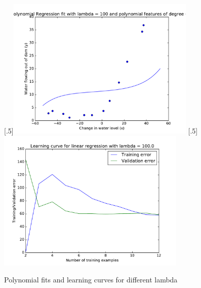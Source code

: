 \documentclass{article}
\begin{document}
\begin{figure}[h]
  [.5\linewidth]{\includegraphics[width=9cm]{part2/fig9_reg100.pdf}}%
  [.5\linewidth]{\includegraphics[width=9cm]{part2/fig10_reg100.pdf}}
\caption{Polynomial fits and learning curves for different lambda}\label{fig:9_10_reg}
\end{figure}
\restoregeometry
\end{document}
